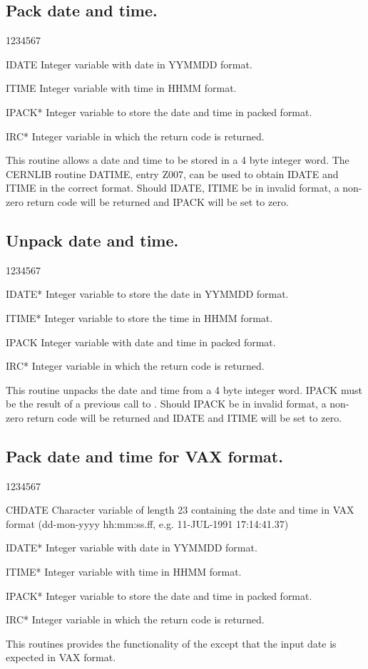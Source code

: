 \subsection{Pack date and time.}
\begin{DLtt}{1234567}
\item[IDATE]
Integer variable with date in YYMMDD format.
\item[ITIME]
Integer variable with time in HHMM format.
\item[IPACK*]
Integer variable to store the date and time in packed format.
\item[IRC*]
Integer variable in which the return code is returned.
\end{DLtt}
This routine allows a date and time to be stored in
a 4 byte integer word.
The CERNLIB routine DATIME, entry Z007, can be
used to obtain IDATE and ITIME in the correct format.
Should IDATE, ITIME be in invalid format, a non-zero return
code will be returned and IPACK will be
set to zero.
\subsection{Unpack date and time.}
\begin{DLtt}{1234567}
\item[IDATE*]
Integer variable to store the date in YYMMDD format.
\item[ITIME*]
Integer variable to store the time in HHMM format.
\item[IPACK]
Integer variable with date and time in packed format.
\item[IRC*]
Integer variable in which the return code is returned.
\end{DLtt}
\par
This routine unpacks the date and time from
a 4 byte integer word.
IPACK must be the result of a previous call to .
Should IPACK be in invalid format, a non-zero return
code will be returned and IDATE and ITIME will be
set to zero.
\subsection{Pack date and time for VAX format.}
\begin{DLtt}{1234567}
\item[CHDATE]
Character variable of length 23 containing the date and time
in VAX format (dd-mon-yyyy hh:mm:ss.ff, e.g. 11-JUL-1991 17:14:41.37)
\item[IDATE*]
Integer variable with date in YYMMDD format.
\item[ITIME*]
Integer variable with time in HHMM format.
\item[IPACK*]
Integer variable to store the date and time in packed format.
\item[IRC*]
Integer variable in which the return code is returned.
\end{DLtt}
\par
This routines provides the functionality of the  
except that the input date is expected in VAX format.
